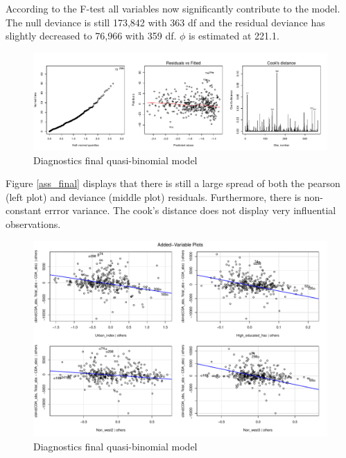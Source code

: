 \documentclass[11pt,]{article}
\begin{document}
According to the F-test all variables now significantly contribute to
the model. The null deviance is still 173,842 with 363 df and the
residual deviance has slightly decreased to 76,966 with 359 df. \(\phi\)
is estimated at 221.1.

\begin{figure}[H]

{\centering \includegraphics{Report_files/figure-latex/unnamed-chunk-21-1} 

}

\caption{\label{ass_final}Diagnostics final quasi-binomial model}\label{fig:unnamed-chunk-21}
\end{figure}

Figure \ref{ass_final} displays that there is still a large spread of
both the pearson (left plot) and deviance (middle plot) residuals.
Furthermore, there is non-constant errror variance. The cook's distance
does not display very influential observations.

\begin{figure}[H]

{\centering \includegraphics{Report_files/figure-latex/unnamed-chunk-22-1} 

}

\caption{\label{av_final}Diagnostics final quasi-binomial model}\label{fig:unnamed-chunk-22}
\end{figure}
\end{document}
